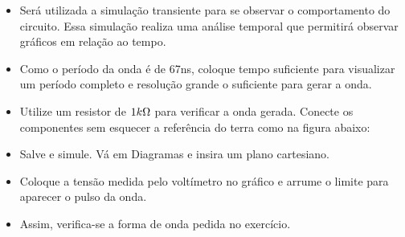 \begin{itemize}
    \item Será utilizada a simulação transiente para se
    observar o comportamento do circuito. Essa
    simulação realiza uma análise temporal que permitirá
    observar gráficos em relação ao tempo.
\end{itemize}


\begin{itemize}
    \item Como o período da onda é de 67ns, coloque tempo
    suficiente para visualizar um período completo e
    resolução grande o suficiente para gerar a onda.
\end{itemize}


\begin{itemize}
    \item Utilize um resistor de $1 k\ohm$ para verificar a onda gerada. Conecte os componentes sem esquecer a referência do terra como na figura abaixo:
\end{itemize}


\begin{itemize}
    \item Salve e simule. Vá em Diagramas e insira um plano cartesiano.
\end{itemize}



\begin{itemize}
    \item Coloque a tensão medida pelo voltímetro no gráfico
    e arrume o limite para aparecer o pulso da onda.
\end{itemize}


\newpage

\begin{itemize}
    \item Assim, verifica-se a forma de onda pedida no
    exercício.
\end{itemize}

